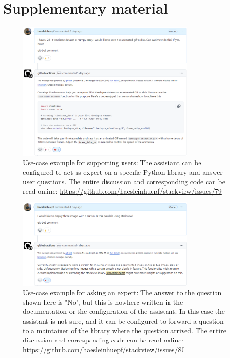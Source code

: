 \documentclass[times, twoside]{zHenriquesLab-StyleBioRxiv}
\begin{document}




\section*{Supplementary material}
\setcounter{figure}{0} 
\renewcommand{\thefigure}{S\arabic{figure}}

\begin{figure}[h]
\centering
\includegraphics[width=0.8\textwidth]{example_supporting_users.png}
\caption{Use-case example for supporting users: The assistant can be configured to act as expert on a specific Python library and answer user questions. The entire discussion and corresponding code can be read online: \url{https://github.com/haesleinhuepf/stackview/issues/79}
\newline
\newline
}
\label{fig:examplesupportingusers}
\end{figure}


\begin{figure}[h]
\centering
\includegraphics[width=0.8\textwidth]{example_supporting_users2.png}
\caption{Use-case example for asking an expert: The answer to the question shown here is "No", but this is nowhere written in the documentation or the configuration of the assistant. In this case the assistant is not sure, and it can be configured to forward a question to a maintainer of the library where the question arrived. The entire discussion and corresponding code can be read online: \url{https://github.com/haesleinhuepf/stackview/issues/80}
\newline
\newline
}
\label{fig:examplesupportingusers2}
\end{figure}
\end{document}
